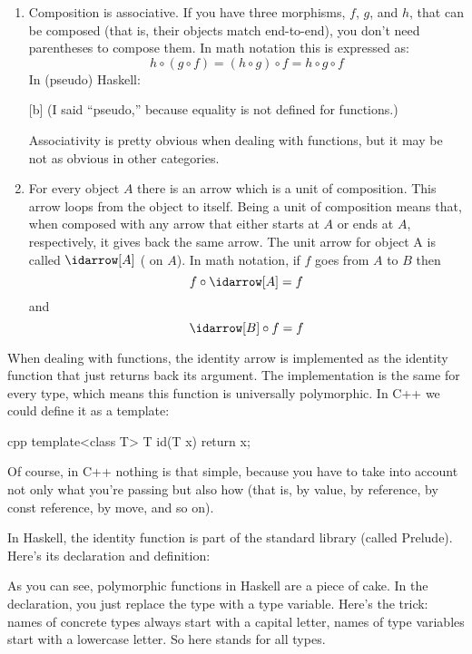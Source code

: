\begin{enumerate}
  \item
        Composition is associative. If you have three morphisms, $f$, $g$, and $h$,
        that can be composed (that is, their objects match end-to-end), you
        don't need parentheses to compose them. In math notation this is
        expressed as:
        \[h \circ (g \circ f) = (h \circ g) \circ f = h \circ g \circ f\]
        In (pseudo) Haskell:

        [b]
        (I said ``pseudo,'' because equality is not defined for functions.)

        Associativity is pretty obvious when dealing with functions, but it may
        be not as obvious in other categories.

  \item
        For every object $A$ there is an arrow which is a unit of composition.
        This arrow loops from the object to itself. Being a unit of composition
        means that, when composed with any arrow that either starts at $A$ or ends
        at $A$, respectively, it gives back the same arrow. The unit arrow for
        object A is called $\idarrow[A]$ ( on $A$). In math
        notation, if $f$ goes from $A$ to $B$ then
        \[f \circ \idarrow[A] = f\]
        and
        \[\idarrow[B] \circ f = f\]
\end{enumerate}
When dealing with functions, the identity arrow is implemented as the
identity function that just returns back its argument. The
implementation is the same for every type, which means this function is
universally polymorphic. In C++ we could define it as a template:

\begin{snip}{cpp}
template<class T> T id(T x) { return x; }
\end{snip}
Of course, in C++ nothing is that simple, because you have to take into
account not only what you're passing but also how (that is, by value, by
reference, by const reference, by move, and so on).

In Haskell, the identity function is part of the standard library
(called Prelude). Here's its declaration and definition:

As you can see, polymorphic functions in Haskell are a piece of cake. In
the declaration, you just replace the type with a type variable. Here's
the trick: names of concrete types always start with a capital letter,
names of type variables start with a lowercase letter. So here
 stands for all types.

